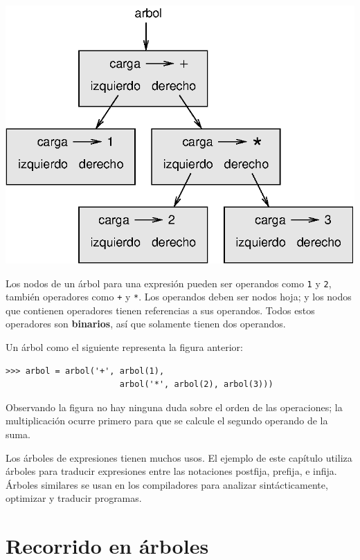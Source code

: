 \beforefig \centerline{\includegraphics{illustrations/tree2}}
\afterfig

Los nodos de un árbol para una expresión pueden ser operandos como
\texttt{1} y \texttt{2}, también operadores como \texttt{+} y \texttt{{*}}.
Los operandos deben ser nodos hoja; y los nodos que contienen operadores
tienen referencias a sus operandos. Todos estos operadores son \textbf{binarios},
así que solamente tienen dos operandos.

Un árbol como el siguiente representa la figura anterior:

\beforeverb 
\begin{verbatim}
>>> arbol = arbol('+', arbol(1), 
                       arbol('*', arbol(2), arbol(3)))
\end{verbatim}
\afterverb Observando la figura no hay ninguna duda sobre el orden
de las operaciones; la multiplicación ocurre primero para que se calcule
el segundo operando de la suma.

Los árboles de expresiones tienen muchos usos. El ejemplo de este
capítulo utiliza árboles para traducir expresiones entre las notaciones
postfija, prefija, e infija. Árboles similares se usan en los compiladores
para analizar sintácticamente, optimizar y traducir programas.

\section{Recorrido en árboles}

   
 

